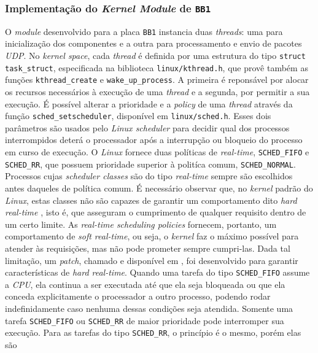 \subsubsection{Implementação do \textit{Kernel Module} de \texttt{BB1}}
\label{sec:bb1}

O \textit{module} desenvolvido para a placa \texttt{BB1} instancia duas
\textit{threads}: uma para inicialização dos componentes e a outra para
processamento e envio de pacotes \textit{UDP}. No \textit{kernel space}, cada
\textit{thread} é definida por uma estrutura do tipo \texttt{struct
task\_struct}, especificada na biblioteca \texttt{linux/kthread.h}, que provê também as funções
\texttt{kthread\_create} e \texttt{wake\_up\_process}. A primeira é reponsável
por alocar os recursos necessários à execução de uma \textit{thread} e a
segunda, por permitir a sua execução. É possível alterar a prioridade e a
\textit{policy} de uma \textit{thread} através da função
\texttt{sched\_setscheduler}, disponível em \texttt{linux/sched.h}. Esses dois
parâmetros são usados pelo \textit{Linux scheduler} para decidir qual dos
processos interrompidos deterá o processador após a interrupção ou bloqueio do
processo em curso de execução. O \textit{Linux} fornece duas políticas de
\textit{real-time}, \texttt{SCHED\_FIFO} e \texttt{SCHED\_RR}, que possuem
prioridade superior à politíca comum, \texttt{SCHED\_NORMAL}. Processos cujas
\textit{scheduler classes} são do tipo \textit{real-time} sempre são escolhidos
antes daqueles de política comum. É necessário observar que,  no \textit{kernel}
padrão do \textit{Linux},  estas classes não são capazes de garantir um
comportamento dito \textit{hard real-time} \cite{linuxlove}, isto é, que
asseguram o cumprimento de qualquer requisito dentro de um certo limite. As
\textit{real-time scheduling policies} fornecem, portanto, um comportamento de
\textit{soft real-time}, ou seja, o \textit{kernel} faz o máximo possível para
atender às requisições, mas não pode prometer sempre cumpri-las. Dada tal
limitação, um \textit{patch}, chamado  e disponível em
\cite{rt}, foi desenvolvido para garantir características de \textit{hard real-time}. Quando
uma tarefa do tipo \texttt{SCHED\_FIFO} assume a \textit{CPU}, ela continua a
ser executada até que ela seja bloqueada ou que ela conceda explicitamente o
processador a outro processo, podendo rodar indefinidamente caso nenhuma dessas
condições seja atendida. Somente uma tarefa \texttt{SCHED\_FIFO} ou
\texttt{SCHED\_RR} de maior prioridade pode interromper sua execução. Para as
tarefas do tipo \texttt{SCHED\_RR}, o princípio é o mesmo, porém elas são
